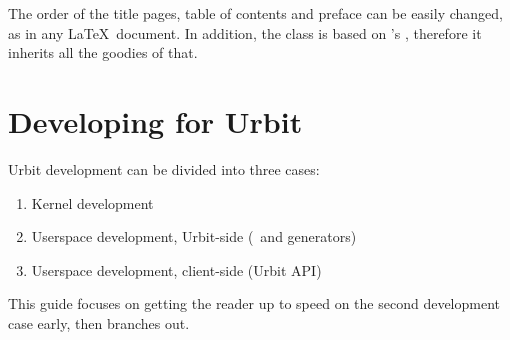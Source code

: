 The order of the title pages, table of contents and preface can be
easily changed, as in any \LaTeX\ document. In addition, the class is
based on \KOMAScript's , therefore it inherits all the
goodies of that.

\section{Developing for Urbit}

Urbit development can be divided into three cases:

\begin{enumerate}
	\item  Kernel development
	\item  Userspace development, Urbit-side (\gall~and generators)
	\item  Userspace development, client-side (Urbit API)
\end{enumerate}

This guide focuses on getting the reader up to speed on the second development case early, then branches out.
